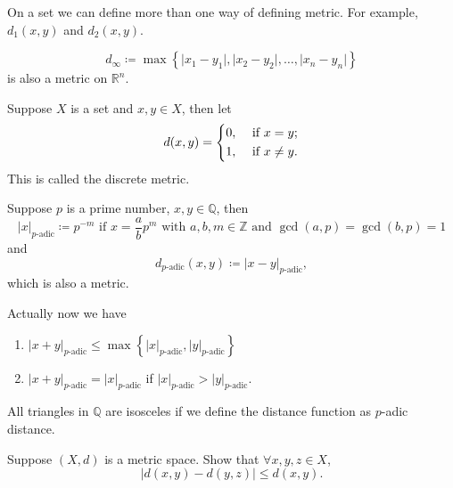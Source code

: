 \begin{note}
    On a set we can define more than one way of defining metric. For example, \(d_1(x,y)\) and \(d_2(x,y)\).  
\end{note}

\begin{eg}
    \[
        d_\infty \coloneqq \max \left\{ \vert x_1 - y_1 \vert, \vert x_2 - y_2 \vert, \dots , \vert x_n - y_n \vert\right\} 
    \] is also a metric on \(\mathbb{R} ^n\). 
\end{eg}

\begin{eg}
    Suppose \(X\) is a set and \(x,y \in X\), then let 
    \[
        d(x,y) = \begin{dcases}
            0, &\text{ if } x = y ;\\
            1, &\text{ if } x \neq y .
        \end{dcases}
    \] This is called the discrete metric.
\end{eg}

\begin{eg}
    Suppose \(p\) is a prime number, \(x, y \in \mathbb{Q} \), then 
    \[
        \vert x \vert_{p\text{-adic}} \coloneqq p^{-m} \text{ if } x = \frac{a}{b} p^m \text{ with } a,b,m \in \mathbb{Z} \text{ and } \gcd(a,p) = \gcd(b,p) = 1
    \]  and 
    \[
        d_{p\text{-adic}}(x,y) \coloneqq \vert x-y \vert_{p\text{-adic}}, 
    \] which is also a metric.
\end{eg}

Actually now we have 
\begin{enumerate}
    \item \(\vert x+y \vert_{p\text{-adic}} \le \max \left\{ \vert x \vert_{p\text{-adic}}, \vert y \vert_{p\text{-adic}} \right\} \)  
    \item \(\vert x+y \vert_{p\text{-adic}} = \vert x \vert_{p\text{-adic}}  \) if \(\vert x \vert_{p\text{-adic}} > \vert y \vert_{p\text{-adic}} \).  
\end{enumerate}
\begin{intuition}
    All triangles in \(\mathbb{Q} \) are isosceles if we define the distance function as \(p\)-adic distance.   
\end{intuition}

\begin{exercise}
    Suppose \((X,d)\) is a metric space. Show that \(\forall x,y,z \in X\), 
    \[
        \left\vert d(x,y) - d(y,z) \right\vert \le d(x,y). 
    \]  
\end{exercise}


